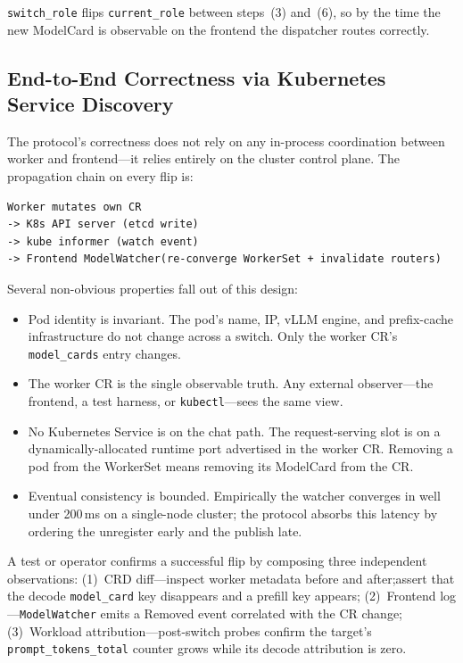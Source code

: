 \documentclass[10pt,twocolumn,letterpaper]{article}
\begin{document}
\texttt{switch\_role} flips \texttt{current\_role} between steps~(3) and~(6), so by the time the new ModelCard is observable on the frontend the dispatcher routes correctly.

\subsection{End-to-End Correctness via Kubernetes Service Discovery}
\label{sec:e2e-correctness}

The protocol's correctness does not rely on any in-process coordination between worker and frontend---it relies entirely on the cluster control plane. The propagation chain on every flip is:

\begin{lstlisting}
Worker mutates own CR
-> K8s API server (etcd write)
-> kube informer (watch event)
-> Frontend ModelWatcher(re-converge WorkerSet + invalidate routers)
\end{lstlisting}

Several non-obvious properties fall out of this design:

\begin{itemize}[nosep]
\item Pod identity is invariant. The pod's name, IP, vLLM engine, and prefix-cache infrastructure do not change across a switch. Only the worker CR's \texttt{model\_cards} entry changes.
\item The worker CR is the single observable truth. Any external observer---the frontend, a test harness, or \texttt{kubectl}---sees the same view.
\item No Kubernetes Service is on the chat path. The request-serving slot is on a dynamically-allocated runtime port advertised in the worker CR. Removing a pod from the WorkerSet means removing its ModelCard from the CR.
\item Eventual consistency is bounded. Empirically the watcher converges in well under 200\,ms on a single-node cluster; the protocol absorbs this latency by ordering the unregister early and the publish late.
\end{itemize}

A test or operator confirms a successful flip by composing three independent observations: (1)~CRD diff---inspect worker metadata before and after;assert that the decode \texttt{model\_card} key disappears and a prefill key appears; (2)~Frontend log---\texttt{ModelWatcher} emits a Removed event correlated with the CR change; (3)~Workload attribution---post-switch probes confirm the target's \texttt{prompt\_tokens\_total} counter grows while its decode attribution is zero.
\end{document}
